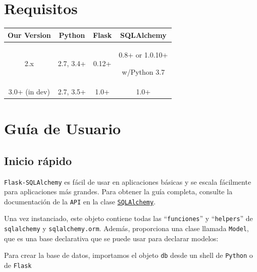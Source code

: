 \documentclass[10pt,letterpaper,notumble]{leaflet}
\begin{document}
    \section{Requisitos}
    
    \begin{tabular}{||c||c||c||c||}
    	\hline
    	\hline
    	\rule[-1ex]{0pt}{2.5ex} Our Version & Python & Flask & SQLAlchemy \\
    	\hline
    	\rule[-1ex]{0pt}{2.5ex} 2.x & 2.7, 3.4+ & 0.12+ &
    	\begin{minipage}[c]{0.25\textwidth}
    		\vspace{0.2cm}
    		\footnotesize{0.8+ or 1.0.10+}
    		
    		w/Python 3.7
    	\end{minipage}
    	 \\
    	\hline
    	\rule[-1ex]{0pt}{2.5ex} 3.0+ (in dev) & 2.7, 3.5+ & 1.0+ & 1.0+ \\
    	\hline
    	\hline
    \end{tabular}
    
    \section{Guía de Usuario}
    
    \subsection{Inicio rápido}
    
    \texttt{Flask-SQLAlchemy} es fácil de usar en aplicaciones básicas y se escala fácilmente para aplicaciones más grandes. Para obtener la guía completa, consulte la documentación de la \texttt{API} en la clase \href{https://flask-sqlalchemy.palletsprojects.com/en/2.x/api/#flask_sqlalchemy.SQLAlchemy}{\texttt{SQLAlchemy}}.
    
    Una vez instanciado, este objeto contiene todas las ``\texttt{funciones}'' y ``\texttt{helpers}'' de \texttt{sqlalchemy} y \texttt{sqlalchemy.orm}. Además, proporciona una clase llamada \texttt{Model}, que es una base declarativa que se puede usar para declarar modelos:
    
    
    
    Para crear la base de datos, importamos el objeto \texttt{db} desde un shell de \texttt{Python} o de \texttt{Flask}
    \vspace*{-0.3cm}
    
\end{document}
